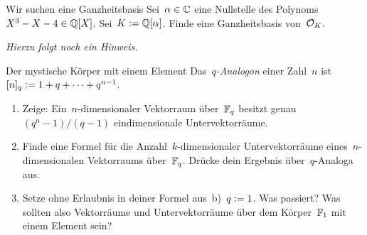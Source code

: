 \documentclass{uebblatt}
\begin{document}
\begin{aufgabe}{Wir suchen eine Ganzheitsbasis}
Sei~$\alpha \in \mathbb{C}$ eine Nullstelle des Polynoms~$X^3 - X - 4 \in \mathbb{Q}[X]$.
Sei~$K \vcentcolon= \mathbb{Q}[\alpha]$. Finde eine Ganzheitsbasis von~$\mathcal{O}_K$.

{\tiny\emph{Hierzu folgt noch ein Hinweis.}\par}
\end{aufgabe}

\begin{aufgabe*}{Der mystische Körper mit einem Element}
Das~\emph{$q$-Analogon} einer Zahl~$n$ ist~$[n]_q \vcentcolon= 1+q+\cdots+q^{n-1}$.
\begin{enumerate}
\item Zeige: Ein~$n$-dimensionaler Vektorraum über~$\mathbb{F}_q$ besitzt
genau~$(q^n-1)/(q-1)$ eindimensionale Untervektorräume.
\item Finde eine Formel für die Anzahl~$k$-dimensionaler Untervektorräume
eines~$n$-dimensionalen Vektorraums über~$\mathbb{F}_q$. Drücke dein Ergebnis
über~$q$-Analoga aus.
\item Setze ohne Erlaubnis in deiner Formel aus~b)~$q \vcentcolon= 1$. Was passiert?
Was sollten also Vektorräume und Untervektorräume über dem
Körper~$\mathbb{F}_1$ mit einem Element sein?
\end{enumerate}
\end{aufgabe*}
\end{document}

